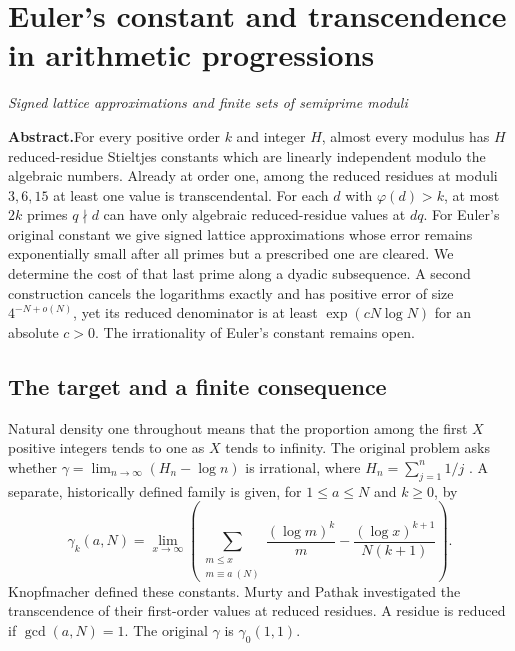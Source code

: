 \documentclass[11pt,a4paper,oneside,openany]{report}
\theoremstyle{remark}\newtheorem{remark}[theorem]{Remark}
\numberwithin{equation}{section}
\begin{document}
\chapter[Transcendence in arithmetic progressions]{Euler's constant and transcendence in arithmetic progressions}\label{chap:6}
{\noindent\large\itshape Signed lattice approximations and finite sets of semiprime moduli\par}\vspace{9pt}
\noindent\textbf{Abstract.}\enspace For every positive order $k$ and integer $H$, almost every modulus has $H$ reduced-residue Stieltjes constants which are linearly independent modulo the algebraic numbers. Already at order one, among the reduced residues at moduli $3,6,15$ at least one value is transcendental. For each $d$ with $\varphi(d)>k$, at most $2k$ primes $q\nmid d$ can have only algebraic reduced-residue values at $dq$. For Euler's original constant we give signed lattice approximations whose error remains exponentially small after all primes but a prescribed one are cleared. We determine the cost of that last prime along a dyadic subsequence. A second construction cancels the logarithms exactly and has positive error of size $4^{-N+o(N)}$, yet its reduced denominator is at least $\exp(cN\log N)$ for an absolute $c>0$. The irrationality of Euler's constant remains open.

\section{The target and a finite consequence}
Natural density one throughout means that the proportion among the first $X$ positive integers tends to one as $X$ tends to infinity. The original problem asks whether $\gamma=\lim_{n\to\infty}(H_n-\log n)$ is irrational, where $H_n=\sum_{j=1}^n1/j$ \cite{lagarias,sondow}. A separate, historically defined family is given, for $1\le a\le N$ and $k\ge0$, by
\[
 \gamma_k(a,N)=\lim_{x\to\infty}\left(\sum_{\substack{m\le x\\m\equiv a\ (N)}}\frac{(\log m)^k}{m}
 -\frac{(\log x)^{k+1}}{N(k+1)}\right).
\]
Knopfmacher \cite{knop} defined these constants. Murty and Pathak \cite{mp} investigated the transcendence of their first-order values at reduced residues. A residue is reduced if $\gcd(a,N)=1$. The original $\gamma$ is $\gamma_0(1,1)$.
\end{document}
